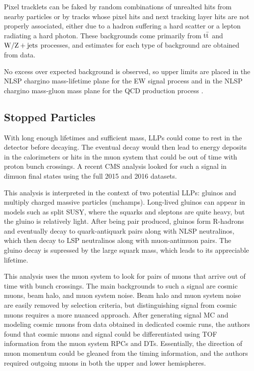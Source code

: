 \documentclass[12pt]{article}
\begin{document}
    Pixel tracklets can be faked by random combinations of unrealted hits from nearby particles or by tracks whose pixel hits and next tracking layer hits are not properly associated, either due to a hadron suffering a hard scatter or a lepton radiating a hard photon. These backgrounds come primarily from $\mathrm{t}\bar{\mathrm{t}}$ and $\mathrm{W}/\mathrm{Z} + \mathrm{jets}$ processes, and estimates for each type of background are obtained from data. 

    No excess over expected background is observed, so upper limits are placed in the NLSP chargino mass-lifetime plane for the EW signal process and in the NLSP chargino mass-gluon mass plane for the QCD production process . 

\subsection{Stopped Particles}
    With long enough lifetimes and sufficient mass, LLPs could come to rest in the detector before decaying. The eventual decay would then lead to energy deposits in the calorimeters or hits in the muon system that could be out of time with proton bunch crossings. A recent CMS analysis looked for such a signal in dimuon final states using the full 2015 and 2016 datasets. 

    This analysis is interpreted in the context of two potential LLPs: gluinos and multiply charged massive particles (mchamps). Long-lived gluinos can appear in models such as split SUSY, where the squarks and sleptons are quite heavy, but the gluino is relatively light. After being pair produced, gluinos form R-hadrons and eventually decay to quark-antiquark pairs along with NLSP neutralinos, which then decay to LSP neutralinos along with muon-antimuon pairs. The gluino decay is supressed by the large squark mass, which leads to its appreciable lifetime.

    This analysis uses the muon system to look for pairs of muons that arrive out of time with bunch crossings. The main backgrounds to such a signal are cosmic muons, beam halo, and muon system noise. Beam halo and muon system noise are easily removed by selection criteria, but distinguishing signal from cosmic muons requires a more nuanced approach. After generating signal MC and modeling cosmic muons from data obtained in dedicated cosmic runs, the authors found that cosmic muons and signal could be differentiated using TOF information from the muon system RPCs and DTs. Essentially, the direction of muon momentum could be gleaned from the timing information, and the authors required outgoing muons in both the upper and lower hemispheres.  
    
\end{document}
